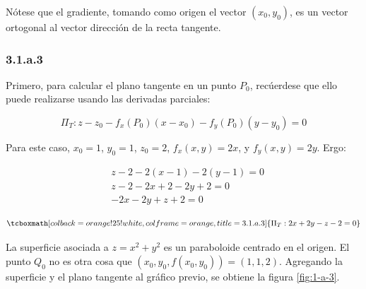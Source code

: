 \documentclass{article}
\begin{document}
Nótese que el gradiente, tomando como origen el vector $(x_0, y_0)$, es un vector ortogonal al vector dirección de la recta tangente.

\subsubsection*{3.1.a.3}
\label{subsubsec:3.1.a.3}

Primero, para calcular el plano tangente en un punto $P_0$, recúerdese que ello puede realizarse usando las derivadas parciales:

\begin{equation}
\Pi_T: z-z_0 - f_x(P_0) (x-x_0) - f_y(P_0) (y-y_0) = 0
\end{equation}

Para este caso, $x_0 = 1$, $y_0 = 1$, $z_0 = 2$, $f_x(x,y) = 2x$, y $f_y(x,y) = 2y$. Ergo:

\begin{subequations}
\begin{align}
& z-2 - 2 (x-1) - 2(y-1) = 0 \\
& z-2 -2x +2 -2y +2 = 0 \\
& -2x -2y + z + 2 = 0
\end{align}
\end{subequations}

\begin{equation}
\tcboxmath[colback=orange!25!white,colframe=orange,title=3.1.a.3]
{
\Pi_T: 2x + 2y -z -2 = 0
}
\end{equation}

La superficie asociada a $z = x^2 + y^2$ es un paraboloide centrado en el origen. El punto $Q_0$ no es otra cosa que $(x_0, y_0, f(x_0, y_0)) = (1, 1, 2)$. Agregando la superficie y el plano tangente al gráfico previo, se obtiene la figura \ref{fig:1-a-3}.
\end{document}
